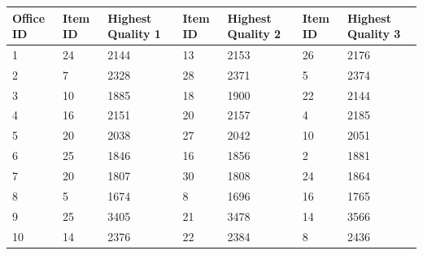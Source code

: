 \documentclass{article}
\begin{document}
            \begin{table}[H]
                \centering
                \begin{tabular}{|l|l|l|l|l|l|l|}
                \hline
                Office ID & Item ID & Highest Quality 1 & Item ID & Highest Quality 2 & Item ID & Highest Quality 3  \\ \hline
                1         & 24      & 2144              & 13      & 2153              & 26      & 2176               \\ \hline
                2         & 7       & 2328              & 28      & 2371              & 5       & 2374               \\ \hline
                3         & 10      & 1885              & 18      & 1900              & 22      & 2144               \\ \hline
                4         & 16      & 2151              & 20      & 2157              & 4       & 2185               \\ \hline
                5         & 20      & 2038              & 27      & 2042              & 10      & 2051               \\ \hline
                6         & 25      & 1846              & 16      & 1856              & 2       & 1881               \\ \hline
                7         & 20      & 1807              & 30      & 1808              & 24      & 1864               \\ \hline
                8         & 5       & 1674              & 8       & 1696              & 16      & 1765               \\ \hline
                9         & 25      & 3405              & 21      & 3478              & 14      & 3566               \\ \hline
                10        & 14      & 2376              & 22      & 2384              & 8       & 2436               \\ \hline
                \end{tabular}
                \end{table}
\end{document}
